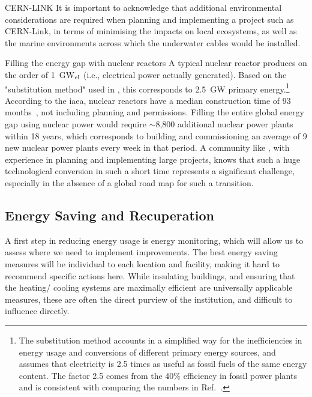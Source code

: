 \documentclass[../SustainableHEP.tex]{subfiles}
\begin{document}
\begin{casestudy}{CERN-LINK}
It is important to acknowledge that additional environmental considerations are required when planning and implementing a project such as CERN-Link, in terms of minimising the impacts on local ecosystems, as well as the marine environments across which the underwater cables would be installed.
\end{casestudy}



\begin{casestudy}{Filling the energy gap with nuclear reactors\label{case:nuclear}}%
    A typical nuclear reactor produces on the order of 1~GW$_{\rm el}$ (i.e., electrical power actually generated).
    Based on the "substitution method" used in , this corresponds to 2.5~GW primary energy.\footnote{The substitution method accounts in a simplified way for the inefficiencies in energy usage and conversions of different primary energy sources, and assumes that electricity is 2.5 times as useful as fossil fuels of the same energy content.  The factor 2.5 comes from the 40\% efficiency in fossil power plants~\cite{BP} and is consistent with comparing the numbers in Ref.~\cite{OWDprod}.} 
    According to the \acrshort{iaea}, nuclear reactors have a median construction time of 93 months~\cite{IAEANuclear}, not including planning and permissions. 
    Filling the entire global energy gap using nuclear power would require $\sim$8,800 additional nuclear power plants within 18 years, which corresponds to building and commissioning an average of 9 new nuclear power plants every week in that period. 
    A community like \ACR, with experience in planning and implementing large projects, knows that such a huge technological conversion in such a short time represents a significant challenge, especially in the absence of a global road map for such a transition.
\end{casestudy}



\subsection{Energy Saving and Recuperation}
\label{sec:Ene-Saving}
A first step in reducing energy usage is energy monitoring, which will allow us to assess where we need to implement improvements. The best energy saving measures will be individual to each location and facility, making it hard to recommend specific actions here. While insulating buildings, and ensuring that the heating/ cooling systems are maximally efficient are universally applicable measures, these are often the direct purview of the institution, and difficult to influence directly.
\end{document}

